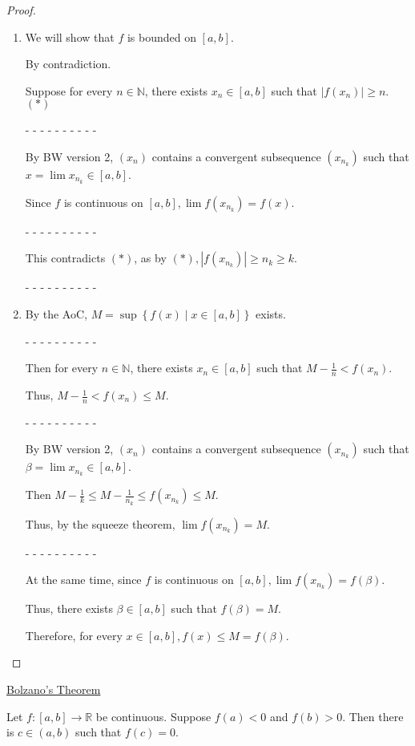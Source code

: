 \documentclass[12pt]{article}
\newcommand{\RR}{\mathbb{R}} %
\newcommand{\NN}{\mathbb{N}}
\newcommand\set[1]{\left\lbrace #1 \right\rbrace} %
\newcommand\abs[1]{\left| #1 \right|} %
\begin{document}
\dotfill

\begin{proof}
$ $

\begin{enumerate}
\item We will show that $f$ is bounded on $[a, b]$.

By contradiction.

Suppose for every $n \in \NN$, there exists $x_n \in [a, b]$ such that $\abs{f(x_n)} \ge n$. $(\ast)$

- - - - - - - - - -

By BW version 2, $(x_n)$ contains a convergent subsequence $(x_{n_k})$ such that $x = \lim x_{n_k} \in [a, b]$.

Since $f$ is continuous on $[a, b], \lim f(x_{n_k}) = f(x)$.

- - - - - - - - - -

This contradicts $(\ast)$, as by $(\ast), \abs{f(x_{n_k})} \ge n_k \ge k$.

- - - - - - - - - -

\item By the AoC, $M = \sup \set{f(x) \mid x \in [a, b]}$ exists.

- - - - - - - - - -

Then for every $n \in \NN$, there exists $x_n \in [a, b]$ such that $M - \frac{1}{n} < f(x_n)$.

Thus, $M - \frac{1}{n} < f(x_n) \le M$.

- - - - - - - - - -

By BW version 2, $(x_n)$ contains a convergent subsequence $(x_{n_k})$ such that $\beta = \lim x_{n_k} \in [a, b]$.

Then $M - \frac{1}{k} \le M - \frac{1}{n_k} \le f(x_{n_k}) \le M$.

Thus, by the squeeze theorem, $\lim f(x_{n_k}) = M$.

- - - - - - - - - -

At the same time, since $f$ is continuous on $[a, b], \lim f(x_{n_k}) = f(\beta)$.

Thus, there exists $\beta \in [a, b]$ such that $f(\beta) = M$.

Therefore, for every $x \in [a, b], f(x) \le M = f(\beta)$.
\end{enumerate}
\end{proof}

\pagebreak

\underline{Bolzano's Theorem}

Let $f: [a, b] \rightarrow \RR$ be continuous. Suppose $f(a) < 0$ and $f(b) > 0$. Then there is $c \in (a, b)$ such that $f(c) = 0$.
\end{document}
